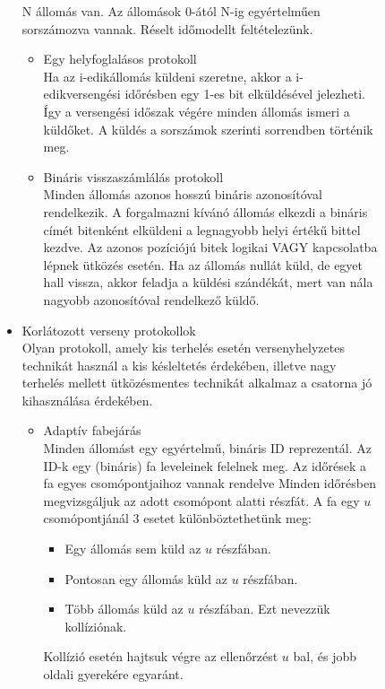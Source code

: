 \documentclass[margin=0px]{article}
\begin{document}
\begin{description}
\begin{description}
\begin{itemize}
								N állomás van. Az állomások 0-ától N-ig egyértelműen sorszámozva vannak. Réselt időmodellt feltételezünk.
								\begin{itemize}
									\item Egy helyfoglalásos protokoll \\
										Ha az i-edikállomás küldeni szeretne, akkor a i-edikversengési időrésben egy 1-es bit elküldésével jelezheti. Így a versengési időszak végére minden állomás ismeri a küldőket. A küldés a sorszámok szerinti sorrendben történik meg.
									\item Bináris visszaszámlálás protokoll \\
										Minden állomás azonos hosszú bináris azonosítóval rendelkezik. A forgalmazni kívánó állomás elkezdi a bináris címét bitenként elküldeni a legnagyobb helyi értékű bittel kezdve. Az azonos pozíciójú bitek logikai VAGY kapcsolatba lépnek ütközés esetén. Ha az állomás nullát küld, de egyet hall vissza, akkor feladja a küldési szándékát, mert van nála nagyobb azonosítóval rendelkező küldő.
								\end{itemize}
							\item Korlátozott verseny protokollok \\
							Olyan protokoll, amely kis terhelés esetén versenyhelyzetes technikát használ a kis késleltetés érdekében, illetve nagy terhelés mellett ütközésmentes technikát alkalmaz a csatorna jó kihasználása érdekében.
								\begin{itemize}
									\item Adaptív fabejárás \\
									Minden állomást egy egyértelmű, bináris ID reprezentál. Az ID-k egy (bináris) fa leveleinek felelnek meg. Az időrések a fa egyes csomópontjaihoz vannak rendelve Minden időrésben megvizsgáljuk az adott csomópont alatti részfát. A fa egy $u$ csomópontjánál 3 esetet
									különböztethetünk meg:
									\begin{itemize}
										\item Egy állomás sem küld az $u$ részfában.
										\item Pontosan egy állomás küld az $u$ részfában.
										\item Több állomás küld az $u$ részfában. Ezt nevezzük kollíziónak.
									\end{itemize}
									Kollízió esetén hajtsuk végre az ellenőrzést $u$ bal, és jobb oldali gyerekére egyaránt.
									

\end{itemize}
\end{itemize}
\end{description}
\end{description}
\end{document}
